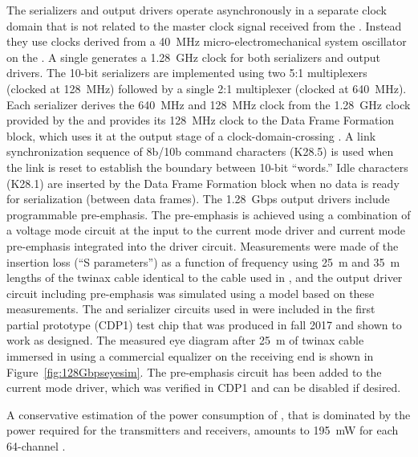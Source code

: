 The serializers and output drivers operate asynchronously in a separate clock domain that
is not related to the master clock signal received from the . Instead
they use clocks derived from a \SI{40}{MHz} micro-electromechanical
system oscillator on the . A single  generates a 
\SI{1.28}{GHz} clock for both serializers and output drivers. The \num{10}-bit
serializers are implemented using two \num{5}:\num{1} multiplexers (clocked at \SI{128}{MHz}) 
followed by a single \num{2}:\num{1} multiplexer (clocked at \SI{640}{MHz}). Each serializer 
derives the \SI{640}{MHz} and \SI{128}{MHz} clock from the \SI{1.28}{GHz} 
clock provided by the  and provides its \SI{128}{MHz} clock to 
the Data Frame Formation block, which uses it at the output stage of a 
clock-domain-crossing . A link synchronization sequence of 8b/10b 
command characters (K28.5) is used when the link is reset to establish the 
boundary between \num{10}-bit ``words.'' Idle characters (K28.1) are inserted 
by the Data Frame Formation block when no data is ready for serialization 
(between data frames). The \SI{1.28}{Gbps} output drivers include programmable 
pre-emphasis. The pre-emphasis is achieved using a combination of a voltage 
mode circuit at the input to the current mode driver and current mode 
pre-emphasis integrated into the driver circuit. Measurements were made 
of the insertion loss (``S parameters'') as a function of frequency using
\SI{25}{m} and \SI{35}{m} lengths of the twinax cable identical to the 
cable used in , and the output driver circuit including 
pre-emphasis was simulated using a  model based on these 
measurements. The  and serializer circuits used in 
were included in the first partial prototype (CDP1) test chip that was 
produced in fall 2017 and shown to work as designed. The measured eye 
diagram after \SI{25}{m} of twinax cable immersed in  using 
a commercial equalizer on the receiving end is shown in Figure~\ref{fig:128Gbpseyesim}.
The pre-emphasis circuit has been added to the current mode driver, which 
was verified in CDP1 and can be disabled if desired. 

A conservative estimation of the power consumption of ,
that is dominated by the power required for the  transmitters
and receivers, amounts to \SI{195}{mW} for each \num{64}-channel .


